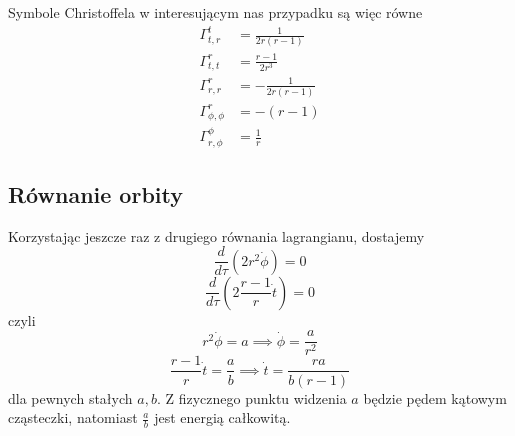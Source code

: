 Symbole Christoffela w interesującym nas przypadku są więc równe
\begin{align*}
  \Gamma_{t,r}^t&=\frac{1}{2r(r-1)}\\ 
  \Gamma_{t,t}^r&=\frac{r-1}{2r^3}\\ 
  \Gamma_{r,r}^r&=-\frac{1}{2r(r-1)}\\ 
  \Gamma_{\phi,\phi}^r&=-(r-1)\\ 
  \Gamma_{r,\phi}^\phi&=\frac{1}{r} 
\end{align*}

\subsection{Równanie orbity}

Korzystając jeszcze raz z drugiego równania lagrangianu, dostajemy
$$ \frac{d}{d\tau}(2r^2\dot{\phi})=0 $$
$$ \frac{d}{d\tau}\left(2\frac{r-1}{r}\dot{t}\right)=0 $$
czyli 
$$ r^2\dot{\phi}=a \implies \dot{\phi}=\frac{a}{r^2}$$
$$ \frac{r-1}{r}\dot{t}=\frac{a}{b} \implies \dot{t}=\frac{ra}{b(r-1)}$$
dla pewnych stałych $a,b$. Z fizycznego punktu widzenia $a$ będzie pędem kątowym cząsteczki, natomiast $\frac{a}{b}$ jest energią całkowitą.

%


